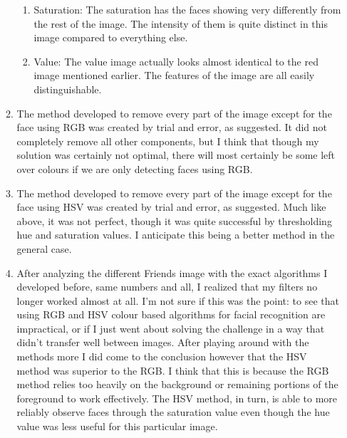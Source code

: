 \documentclass[10pt]{article}
\begin{document}
\begin{enumerate}
\begin{enumerate}
\begin{enumerate}
\item Saturation: The saturation has the faces showing very differently from the rest of the image. The intensity of them is quite distinct in this image compared to everything else.
\item Value: The value image actually looks almost identical to the red image mentioned earlier. The features of the image are all easily distinguishable.
\end{enumerate}
\item The method developed to remove every part of the image except for the face using RGB was created by trial and error, as suggested. It did not completely remove all other components, but I think that though my solution was certainly not optimal, there will most certainly be some left over colours if we are only detecting faces using RGB.
\item The method developed to remove every part of the image except for the face using HSV was created by trial and error, as suggested. Much like above, it was not perfect, though it was quite successful by thresholding hue and saturation values. I anticipate this being a better method in the general case.
\item After analyzing the different Friends image with the exact algorithms I developed before, same numbers and all, I realized that my filters no longer worked almost at all. I'm not sure if this was the point: to see that using RGB and HSV colour based algorithms for facial recognition are impractical, or if I just went about solving the challenge in a way that didn't transfer well between images. After playing around with the methods more I did come to the conclusion however that the HSV method was superior to the RGB. I think that this is because the RGB method relies too heavily on the background or remaining portions of the foreground to work effectively. The HSV method, in turn, is able to more reliably observe faces through the saturation value even though the hue value was less useful for this particular image.
\end{enumerate}



\end{enumerate}
\end{document}

